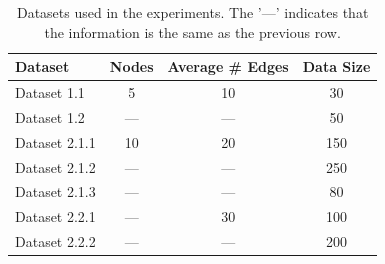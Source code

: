 \documentclass{lxaiproposal}
\begin{document}
    \begin{table}[h]
        \centering
        \begin{tabular}{|l|c|c|c|}
            \hline
            \textbf{Dataset} & \textbf{Nodes} & \textbf{Average # Edges} & \textbf{Data Size} \\
            \hline
            Dataset 1.1      & 5              & 10                       & 30                 \\
            Dataset 1.2      & ---            & ---                      & 50                 \\
            \hline
            Dataset 2.1.1    & 10             & 20                       & 150                \\
            Dataset 2.1.2    & ---            & ---                      & 250                \\
            Dataset 2.1.3    & ---            & ---                      & 80                 \\
            \hline
            Dataset 2.2.1    & ---            & 30                       & 100                \\
            Dataset 2.2.2    & ---            & ---                      & 200                \\

            \hline
        \end{tabular}
        \caption{Datasets used in the experiments. The '---' indicates that the information is the same as the previous
        row.}
        \label{tab:datasets}
    \end{table}
\end{document}
